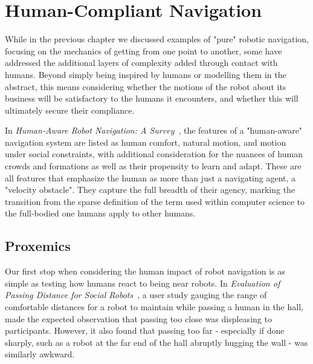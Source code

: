 \documentclass{sfuthesis}
\begin{document}




\section{Human-Compliant Navigation}

While in the previous chapter we discussed examples of "pure" robotic navigation, focusing on the mechanics of getting from one point to another, some have addressed the additional layers of complexity added through contact with humans. Beyond simply being inspired by humans or modelling them in the abstract, this means considering whether the motions of the robot about its business will be satisfactory to the humans it encounters, and whether this will ultimately secure their compliance.

In \textit{Human-Aware Robot Navigation: A Survey}~\cite{kruse2013human}, the features of a "human-aware" navigation system are listed as human comfort, natural motion, and motion under social constraints, with additional consideration for the nuances of human crowds and formations as well as their propensity to learn and adapt. These are all features that emphasize the human as more than just a navigating agent, a "velocity obstacle". They capture the full breadth of their agency, marking the transition from the sparse definition of the term used within computer science to the full-bodied one humans apply to other humans.





\subsection{Proxemics}

Our first stop when considering the human impact of robot navigation is as simple as testing how humans react to being near robots. In \textit{Evaluation of Passing Distance for Social Robots}~\cite{pacchierotti2006evaluation}, a user study gauging the range of comfortable distances for a robot to maintain while passing a human in the hall, made the expected observation that passing too close was displeasing to participants. However, it also found that passing too far - especially if done sharply, such as a robot at the far end of the hall abruptly hugging the wall - was similarly awkward. 
\end{document}
